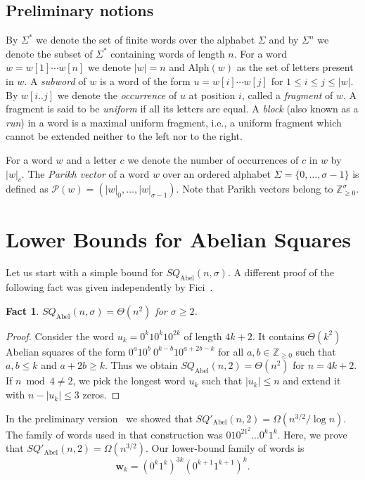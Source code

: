 \documentclass{article}
\theoremstyle{plain}
\newtheorem{fact}[theorem]{Fact}
\theoremstyle{definition}
\theoremstyle{remark}
\renewcommand{\P}{\mathcal{P}}
\newcommand{\ww}{\mathbf{w}}
\newcommand{\SQ}{\mathit{SQ}}
\renewcommand{\Alph}{\mathrm{Alph}}
\newcommand{\SQABEL}{\SQ_{\mathrm{Abel}}}
\newcommand{\SQPABEL}{\SQ'_{\mathrm{Abel}}}
\newcommand{\hasha}[2]{|#1|_{#2}}
\begin{document}
  \subsection*{Preliminary notions}

  By $\Sigma^*$ we denote the set of finite words over the alphabet $\Sigma$ and by
  $\Sigma^n$ we denote the subset of $\Sigma^*$ containing words of length $n$.
  For a word $w=w[1]\cdots w[n]$ we denote $|w|=n$ and $\Alph(w)$ as the set of letters present in $w$.
  A \emph{subword} of $w$ is a word of the form $u=w[i] \cdots w[j]$ for $1\le i\le j \le |w|$.
  By $w[i..j]$ we denote the \emph{occurrence} of $u$ at position $i$, called a \emph{fragment}
  of $w$. 
  A fragment is said to be \emph{uniform} if all its letters are equal.
  A \emph{block} (also known as a \emph{run}) in a word is a maximal uniform fragment, i.e.,
  a uniform fragment which cannot be extended neither to the left nor to the right.
  
  For a word $w$ and a letter $c$ we denote the number of occurrences of $c$ in $w$ by $\hasha{w}{c}$.
  The \emph{Parikh vector} of a word $w$ over an ordered alphabet $\Sigma=\{0,\ldots,\sigma-1\}$
  is defined as $\P(w)=(\hasha{w}{0},\ldots, \hasha{w}{\sigma-1}).$
  Note that Parikh vectors belong to $\mathbb{Z}_{\ge 0}^\sigma$.
    

  \section{Lower Bounds for Abelian Squares}\label{sec:lower}
  Let us start with a simple bound for $\SQABEL(n,\sigma)$.
  A different proof of the following fact was given independently by Fici~\cite{Fici}.

  \begin{fact}{\label{fct:sq-ab-lower-bound}}
    $\SQABEL(n,\sigma)=\Theta(n^2)$ for $\sigma \ge 2$.
  \end{fact}
  \begin{proof}
    Consider the word $u_k=0^k 1 0^k 1 0^{2k}$ of length $4k+2$.
    It contains $\Theta(k^2)$ Abelian squares of the form
    $0^a 10^b\ 0^{k-b} 1 0^{a+2b-k}$ for all $a,b\in \mathbb{Z}_{\ge 0}$ such that $a,b\le k$ and $a+2b\ge k.$
    Thus we obtain $\SQABEL(n,2)=\Theta(n^2)$ for $n=4k+2$.
    If $n \bmod 4 \ne 2$, we pick the longest word $u_k$ such that $|u_k| \le n$
    and extend it with $n-|u_k| \le 3$ zeros.
  \end{proof}

  In the preliminary version~\cite{DBLP:conf/dlt/KociumakaRRW14} we showed that $\SQPABEL(n,2) = \Omega(n^{3/2}/\log n)$.
  The family of words used in that construction was $01 0^21^2 \ldots 0^k1^k$.
  Here, we prove that $\SQPABEL(n,2) = \Omega(n^{3/2})$.
  Our lower-bound family of words is
  \[\ww_k = (0^{k}1^{k})^{3k} (0^{k+1}1^{k+1})^{k}.\]
  
\end{document}
